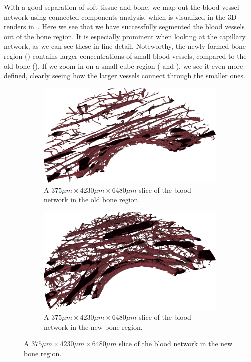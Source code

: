 With a good separation of soft tissue and bone, we map out the blood vessel
network using connected components analysis, which is visualized in the 3D
renders in~. Here we see that we have successfully
segmented the blood vessels out of the bone region. It is especially prominent
when looking at the capillary network, as we can see these in fine detail.
Noteworthy, the newly formed bone region () contains
larger concentrations of small blood vessels, compared to the old bone
(). If we zoom in on a small cube region
( and ), we see it even more
defined, clearly seeing how the larger vessels connect through the smaller
ones.

\begin{figure}
    \centering
    \begin{subfigure}[b]{\linewidth}
    \centering
        \includegraphics[width=.7\linewidth]{generated/figure10_old_bone.png}
        \caption{A $375\mu m \times 4230\mu m \times 6480\mu m$ slice of the blood network in the old bone region.}
        \label{fig:blood-old-slice}
    \end{subfigure}
    \begin{subfigure}[b]{\linewidth}
    \centering
        \includegraphics[width=.7\linewidth]{generated/figure10_new_bone.png}
        \caption{A $375\mu m \times 4230\mu m \times 6480\mu m$ slice of the blood network in the new bone region.}

\end{subfigure}
\end{figure}
